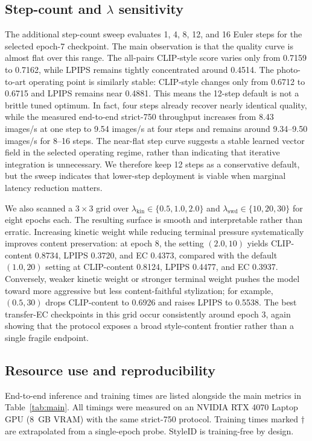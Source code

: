 ﻿\documentclass[letterpaper]{article}
\begin{document}
\subsection{Step-count and $\lambda$ sensitivity}
The additional step-count sweep evaluates 1, 4, 8, 12, and 16 Euler steps for the selected epoch-7 checkpoint. The main observation is that the quality curve is almost flat over this range. The all-pairs CLIP-style score varies only from 0.7159 to 0.7162, while LPIPS remains tightly concentrated around 0.4514. The photo-to-art operating point is similarly stable: CLIP-style changes only from 0.6712 to 0.6715 and LPIPS remains near 0.4881. This means the 12-step default is not a brittle tuned optimum. In fact, four steps already recover nearly identical quality, while the measured end-to-end strict-750 throughput increases from 8.43 images/s at one step to 9.54 images/s at four steps and remains around 9.34--9.50 images/s for 8--16 steps. The near-flat step curve suggests a stable learned vector field in the selected operating regime, rather than indicating that iterative integration is unnecessary. We therefore keep 12 steps as a conservative default, but the sweep indicates that lower-step deployment is viable when marginal latency reduction matters.

We also scanned a $3 \times 3$ grid over $\lambda_{\mathrm{kin}} \in \{0.5, 1.0, 2.0\}$ and $\lambda_{\mathrm{swd}} \in \{10, 20, 30\}$ for eight epochs each. The resulting surface is smooth and interpretable rather than erratic. Increasing kinetic weight while reducing terminal pressure systematically improves content preservation: at epoch 8, the setting $(2.0, 10)$ yields CLIP-content 0.8734, LPIPS 0.3720, and EC 0.4373, compared with the default $(1.0, 20)$ setting at CLIP-content 0.8124, LPIPS 0.4477, and EC 0.3937. Conversely, weaker kinetic weight or stronger terminal weight pushes the model toward more aggressive but less content-faithful stylization; for example, $(0.5, 30)$ drops CLIP-content to 0.6926 and raises LPIPS to 0.5538. The best transfer-EC checkpoints in this grid occur consistently around epoch 3, again showing that the protocol exposes a broad style-content frontier rather than a single fragile endpoint.

\subsection{Resource use and reproducibility}
End-to-end inference and training times are listed alongside the main metrics in Table~\ref{tab:main}. All timings were measured on an NVIDIA RTX 4070 Laptop GPU (8~GB VRAM) with the same strict-750 protocol. Training times marked $\dagger$ are extrapolated from a single-epoch probe. StyleID is training-free by design.
\end{document}
